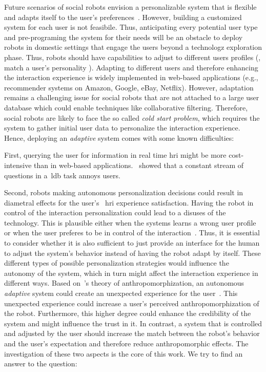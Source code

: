 \documentclass[twocolumn]{svjour3}          %
\begin{document}
Future scenarios of social robots envision a personalizable system that is flexible and adapts itself to the user's preferences~\autocite{leite}. 
However, building a customized system for each user is not feasibile. Thus, anticipating every potential user type and pre-programing the system for their needs will be an obstacle to deploy robots in domestic settings that engage the users beyond a technologz exploration phase. Thus, robots should have capabilities to adjust to different users profiles (\eg{}, match a user's personality \autocite{andrist2015look}). Adapting to different users and therefore enhancing the interaction experience is widely implemented in web-based applications (e.g., recommender systems on Amazon, Google, eBay, Netflix). 
However, adaptation remains a challenging issue for social robots that are not attached to a large user database which could enable techniques like collaborative filtering. 
Therefore, social robots are likely to face the so called \textit{cold start problem}, which requires the system to gather initial user data to personalize the interaction experience. Hence, deploying an \textit{adaptive} system comes with some known difficulties:

First, querying the user for information in real time \gls{hri} might be more
cost-intensive than in web-based applications.~\textcite{cakmak2010designing} showed that a constant stream of questions in a~\gls{ldb} task annoys users.

Second, robots making autonomous personalization
decisions could result in diametral effects for the user's ~\gls{hri} experience satisfaction. Having the robot in control of the interaction personalization could lead to a disuses of the technology. This is plausible either when the systems learns a wrong user profile or when the user preferes to be in control of the interaction~\cite{burger2013desire}. Thus, it is essential to consider whether it is also sufficient to just provide an interface for the human to adjust the system's behavior instead of having the robot adapt by itself.
These different types of possible personalization strategies would influence the autonomy of the system, which in turn might affect the interaction experience in different ways.
Based on~\citeauthor{epley2007seeing}'s theory of anthropomorphization, an autonomous \textit{adaptive} system could create an unexpected experience for the user~\autocite{epley2007seeing}. This unexpected experience could increase a user's perceived anthropomorphization of the robot. Furthermore, this higher degree could enhance the credibility of the system and might influence the trust in it. In contrast, a system that is controlled and adjusted by the user should increase the match between the robot's behavior and the user's expectation and therefore reduce anthropomorphic effects. The investigation of these two aspects is the core of this work. We try to find an answer to the question:
\end{document}
